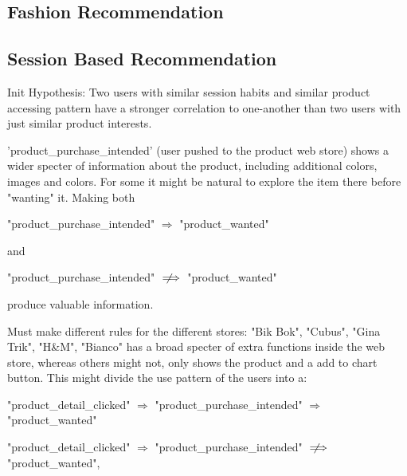 




\subsection{Fashion Recommendation}



\subsection{Session Based Recommendation}
Init Hypothesis:
Two users with similar session habits and similar product accessing pattern have a stronger correlation to one-another than two users with just similar product interests.


'product\_purchase\_intended' (user pushed to the product web store) shows a wider specter of information about the product, including additional colors, images and colors.
For some it might be natural to explore the item there before "wanting" it. Making both

"product\_purchase\_intended" $\Rightarrow$ "product\_wanted"

and

"product\_purchase\_intended" $\notimplies$ "product\_wanted"

produce valuable information.

Must make different rules for the different stores:
"Bik Bok", "Cubus", "Gina Trik", "H\&M", "Bianco" has a broad specter of extra functions inside the web store, whereas others might not, only shows the product and a add to chart button.
This might divide the use pattern of the users into a:

"product\_detail\_clicked" $\Rightarrow$ "product\_purchase\_intended" $\Rightarrow$ "product\_wanted"

"product\_detail\_clicked" $\Rightarrow$ "product\_purchase\_intended" $\notimplies$ "product\_wanted",

